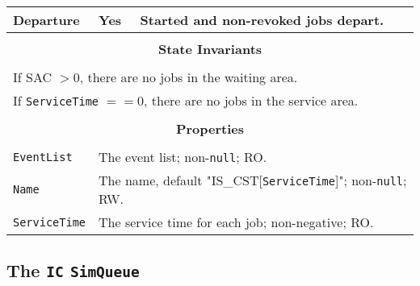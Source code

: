 \documentclass[12pt]{book}
\begin{document}
\begin{tabular}{|l|l|l|}
\hline
Departure & Yes & Started and non-revoked jobs depart. \\
\hline
\multicolumn{3}{|c|}{} \\
\multicolumn{3}{|c|}{\bf State  Invariants} \\
\multicolumn{3}{|c|}{} \\
\hline
\multicolumn{3}{|l|}{If SAC $> 0$, there are no jobs in the waiting area.} \\
\multicolumn{3}{|l|}{If \lstinline|ServiceTime| $== 0$, there are no jobs in the service area.} \\
\hline
\multicolumn{3}{|c|}{} \\
\multicolumn{3}{|c|}{\bf Properties} \\
\multicolumn{3}{|c|}{} \\
\hline
\lstinline|EventList|       & \multicolumn{2}{|l|}{The event list; non-\lstinline|null|; RO.} \\
\hline
\lstinline|Name|            & \multicolumn{2}{|l|}{The name, default "IS\_CST[\lstinline|ServiceTime|]";
                                                   non-\lstinline|null|; RW.} \\
\hline
\lstinline|ServiceTime|     & \multicolumn{2}{|l|}{The service time for each job; non-negative; RO.} \\
\hline
\end{tabular}

\subsection{The \lstinline{IC} \lstinline{SimQueue}}
\end{document}
